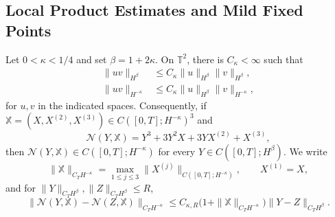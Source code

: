 \subsection{Local Product Estimates and Mild Fixed Points}
\label{subsec:spde-dpd-local-product-fixed-point}

\begin{lemma}
\label{lem:spde-dpd-sobolev-products}
Let \(0<\kappa<1/4\) and set \(\beta=1+2\kappa\).  On \(\mathbb T^2\),
there is \(C_\kappa<\infty\) such that
\begin{align}
  \|uv\|_{H^\beta}
  &\leq C_\kappa\|u\|_{H^\beta}\|v\|_{H^\beta},
  \label{eq:spde-hbeta-algebra}\\
  \|uv\|_{H^{-\kappa}}
  &\leq C_\kappa\|u\|_{H^\beta}\|v\|_{H^{-\kappa}},
  \label{eq:spde-hbeta-negative-multiplier}
\end{align}
for \(u,v\) in the indicated spaces.  Consequently, if
\(\mathbb X=(X,X^{(2)},X^{(3)})\in C([0,T];H^{-\kappa})^3\) and
\begin{equation}
  \mathcal N(Y,\mathbb X)
  =
  Y^3+3Y^2X+3YX^{(2)}+X^{(3)},
  \label{eq:spde-dpd-nonlinearity}
\end{equation}
then \(\mathcal N(Y,\mathbb X)\in C([0,T];H^{-\kappa})\) for every
\(Y\in C([0,T];H^\beta)\).  We write
\[
  \|\mathbb X\|_{C_TH^{-\kappa}}
  =
  \max_{1\leq j\leq3}\|X^{(j)}\|_{C([0,T];H^{-\kappa})},
  \qquad X^{(1)}=X,
\]
and for
\(\|Y\|_{C_TH^\beta},\|Z\|_{C_TH^\beta}\leq R\),
\begin{equation}
  \|\mathcal N(Y,\mathbb X)-\mathcal N(Z,\mathbb X)\|_{C_TH^{-\kappa}}
  \leq
  C_{\kappa,R}\bigl(1+\|\mathbb X\|_{C_TH^{-\kappa}}\bigr)
  \|Y-Z\|_{C_TH^\beta}.
  \label{eq:spde-dpd-nonlinearity-lipschitz}
\end{equation}
\end{lemma}

